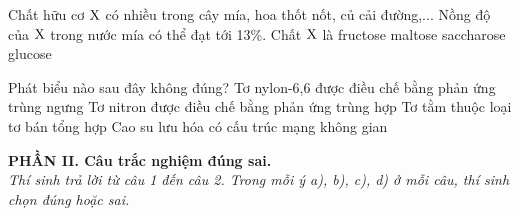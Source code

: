 \documentclass[11pt,a4paper]{article}
\begin{document}
\begin{ex}
Chất hữu cơ $\ce{X}$ có nhiều trong cây mía, hoa thốt nốt, củ cải đường,... Nồng độ của $\ce{X}$ trong nước mía có thể đạt tới 13\%. Chất $\ce{X}$ là
\choice
{fructose}
{maltose}
{\True saccharose}
{glucose}

\end{ex}
\begin{ex}
Phát biểu nào sau đây không đúng?
\choice
{Tơ nylon-6,6 được điều chế bằng phản ứng trùng ngưng}
{Tơ nitron được điều chế bằng phản ứng trùng hợp}
{\True Tơ tằm thuộc loại tơ bán tổng hợp}
{Cao su lưu hóa có cấu trúc mạng không gian}

\end{ex}
\vspace{4pt}
\noindent
{\color{mainGreen}\textbf{\large PHẦN II. Câu trắc nghiệm đúng sai.}}\\
\textit{\small Thí sinh trả lời từ câu 1 đến câu 2. Trong mỗi ý a), b), c), d) ở mỗi câu, thí sinh chọn đúng hoặc sai.}
\vspace{2pt}
\end{document}
